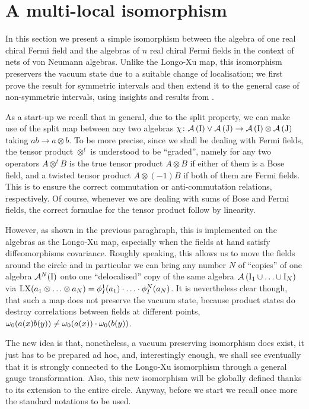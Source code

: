  \section{A multi-local isomorphism}
 \label{A multi-local isomorphism}
 In this section we present a simple isomorphism between 
 the algebra of one real chiral Fermi field and the algebras 
 of $n$ real chiral Fermi fields in the context of 
 nets of von Neumann algebras. Unlike the Longo-Xu map, 
 this isomorphism preservers
 the vacuum state due to a suitable change of localisation;
 we first prove the result for symmetric intervals and 
 then extend it to the general case of non-symmetric intervals,
 using insights and results from \cite{CH:2009}.
 
 \bigskip
 As a start-up we recall that in general, due to the
 split property, we can make use of the 
 split map between any two algebras $\chi\colon\mathcal{A}\left(\textrm{I}\right)\vee
 \mathcal{A}\left(\textrm{J}\right)\to\mathcal{A}\left(\textrm{I}\right)\otimes\mathcal{A}\left(\textrm{J}\right)$
 taking $ab\to a\otimes b$. To be more precise, since we
 shall be dealing with Fermi fields, the tensor product
 $\otimes^t$ is understood to be ``graded'', namely 
 for any two operators $A\otimes^t B$ is the true tensor
 product $A\otimes B$ if either of them is a Bose field, and a 
 twisted tensor product $A\otimes (-1)B$ if both of them 
 are Fermi fields. This is to ensure the correct commutation 
 or anti-commutation relations, respectively. Of course,
 whenever we are dealing with sums of 
 Bose and Fermi fields, the correct formulae for the tensor 
 product follow by linearity.
 
 However, as shown in the previous paraghraph, this is 
 implemented on the algebras as the Longo-Xu map, especially 
 when the fields at hand satisfy diffeomorphisms covariance. 
 Roughly speaking, this allows us to move the fields around the 
 circle and in particular we can bring any number $N$ of 
 ``copies'' of one algebra $\mathcal{A}^N(\textrm{I})$ onto 
 one ``delocalised'' copy of the same algebra 
 $\mathcal{A}\left(\textrm{I}_1\cup\ldots\cup\textrm{I}_N\right)$ via 
 $\textrm{LX}(a_1\otimes\ldots\otimes a_N)=
 \phi_I^1(a_1)\cdot\ldots\cdot\phi_I^N(a_N)$.
 It is nevertheless clear though, that such a map does not
 preserve the vacuum state, because product states do
 destroy correlations between fields at different points,
 $\omega_0(a(x)b(y))\neq \omega_0(a(x))\cdot\omega_0(b(y))$. 
 
 The new idea is that, nonetheless, a vacuum preserving 
 isomorphism does exist, it just has to be prepared ad hoc,
 and, interestingly enough, we shall see eventually that it 
 is strongly connected to the Longo-Xu isomorphism 
 through a general gauge transformation. Also, this new 
 isomorphism will be globally defined thanks to its 
 extension to the entire circle. Anyway, before we start we 
 recall once more the standard notations to be used.
 
